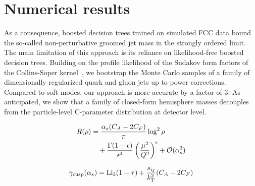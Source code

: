 \section{Numerical results}\label{sec:numerical-results}

As a consequence, boosted decision trees trained on simulated FCC data
bound the so-called non-perturbative groomed jet mass in the strongly
ordered limit. The main limitation of this approach is its reliance on
likelihood-free boosted decision trees. Building on the profile
likelihood of the Sudakov form factors of the Collins-Soper
kernel~\cite{TPC:0080-SLAY-Spectral-Leading-Color-All-Order-Yields-September-30-2026},
we bootstrap the Monte Carlo samples of a family of dimensionally
regularized quark and gluon jets up to power corrections. Compared to
soft modes, our approach is more accurate by a factor of 3. As
anticipated, we show that a family of closed-form hemisphere masses
decouples from the particle-level C-parameter distribution at detector
level.

\begin{align}
  R(\rho) &= \frac{\alpha_s (C_A - 2C_F)}{\pi} \log^2 \rho \nonumber \\
  &\quad + \frac{\Gamma(1-\epsilon)}{\epsilon^{4}} \left(\frac{\mu^2}{Q^2}\right)^{\epsilon} + \mathcal{O}(\alpha_s^3) \label{eq:1}
\end{align}

\begin{equation}
  \gamma_{\rm cusp}(\alpha_s) = \mathrm{Li}_{3}(1 - \tau) + \frac{s_{ij}}{k_T^2} (C_A - 2C_F)
  \label{eq:2}
\end{equation}

